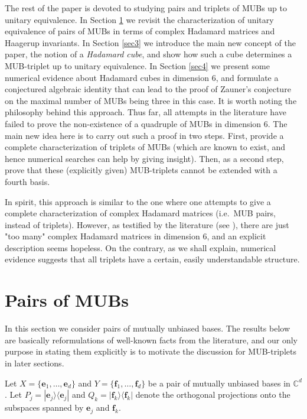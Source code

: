 \documentclass[12pt]{amsart}
\numberwithin{equation}{section}
\theoremstyle{definition}
\theoremstyle{remark}
\theoremstyle{remark}
\newcommand{\CC}{\ensuremath{\mathbb{C}}}
\newcommand{\eb}{\ensuremath{\mathbf{e}}}
\newcommand{\fb}{\ensuremath{\mathbf{f}}}
\begin{document}
The rest of the paper is devoted to studying pairs and triplets of MUBs up to unitary equivalence. In Section \ref{sec2} we revisit the characterization of unitary equivalence of pairs of MUBs in terms of complex Hadamard matrices and Haagerup invariants. In Section \ref{sec3} we introduce the main new concept of the paper, the notion of a {\it Hadamard cube}, and show how such a cube determines a MUB-triplet up to unitary equivalence. In Section \ref{sec4} we present some numerical evidence about Hadamard cubes in dimension 6, and formulate a conjectured algebraic identity that can lead to the proof of Zauner's conjecture on the maximal number of MUBs being three in this case. It is worth noting the philosophy behind this approach. Thus far, all attempts in the literature have failed to prove the non-existence of a quadruple of MUBs in dimension 6. The main new idea here is to carry out such a proof in two steps. First, provide a complete characterization of triplets of MUBs (which are known to exist, and hence numerical searches can help by giving insight). Then, as a second step, prove that these (explicitly given) MUB-triplets cannot be extended with a fourth basis. 

In spirit, this approach is similar to the one where one attempts to give a complete characterization of complex Hadamard matrices (i.e.\ MUB pairs, instead of triplets). However, as testified by the literature (see \cite{generic}),  there are just "too many" complex Hadamard matrices in dimension $6$, and an explicit description seems hopeless. On the contrary, as we shall explain, numerical evidence suggests that all triplets have a certain, easily understandable structure.

\section{Pairs of MUBs}\label{sec2}

In this section we consider pairs of mutually unbiased bases. The results below are basically reformulations of well-known facts from the literature, and our only purpose in stating them explicitly is to motivate the discussion for MUB-triplets in later sections. 

\medskip

Let $X=\{\eb_1,\ldots,\eb_d\}$ and $Y=\{\fb_1,\ldots,\fb_d\}$ be a pair of mutually unbiased bases in $\CC^d$. Let $P_j=|\eb_j\rangle \langle \eb_j|$ and $Q_k=|\fb_k\rangle \langle \fb_k|$ denote the orthogonal projections onto the subspaces spanned by $\eb_j$ and $\fb_k$. 
\end{document}
